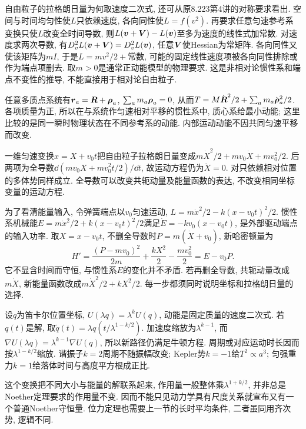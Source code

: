 自由粒子的拉格朗日量为何取速度二次式, 还可从原8.223第4讲的对称要求看出. 空间与时间均匀性使$L$只依赖速度, 各向同性使$L=f(v^2)$. 再要求任意匀速参考系变换只使$L$改变全时间导数, 则$L(\boldsymbol{v}+\boldsymbol{V})-L(\boldsymbol{v})$至多为速度的线性式加常数. 对速度求两次导数, 有$D_v^2L(\boldsymbol{v}+\boldsymbol{V})=D_v^2L(\boldsymbol{v})$, 任意$\boldsymbol{V}$使Hessian为常矩阵. 各向同性又使该矩阵为$mI$, 于是$L=m v^2/2+$常数, 可能的固定线性速度项被各向同性排除或作为端点项删去. 取$m>0$是通常正动能模型的物理要求. 这是非相对论惯性系和端点不变性的推导, 不能直接用于相对论自由粒子.

任意多质点系统有$\boldsymbol{r}_a=\boldsymbol{R}+\boldsymbol{\rho}_a$, $\sum_am_a\boldsymbol{\rho}_a=0$, 从而$T=M\dot{\boldsymbol{R}}^2/2+\sum_am_a\dot{\boldsymbol{\rho}}_a^2/2$. 各项质量为正, 所以在与系统作匀速相对平移的惯性系中, 质心系给最小动能; 这里比较的是同一瞬时物理状态在不同参考系的动能. 内部运动动能不因共同匀速平移而改变.

一维匀速变换$x=X+v_0t$把自由粒子拉格朗日量变成$m\dot X^2/2+mv_0\dot X+mv_0^2/2$. 后两项为全导数$\dd(mv_0X+mv_0^2t/2)/\dd t$, 故运动方程仍为$\ddot X=0$. 对只依赖相对位置的多体势同样成立. 全导数可以改变共轭动量及能量函数的表达, 不改变相同坐标变量的运动方程.

为了看清能量输入, 令弹簧端点以$v_0$匀速运动, $L=m\dot x^2/2-k(x-v_0t)^2/2$. 惯性系机械能$E=m\dot x^2/2+k(x-v_0t)^2/2$满足$\dot E=-kv_0(x-v_0t)$, 是外部驱动端点的输入功率. 取$X=x-v_0t$, 不删全导数时$P=m(\dot X+v_0)$, 新哈密顿量为
\[
H'=\frac{(P-mv_0)^2}{2m}+\frac{kX^2}2-\frac{mv_0^2}2
=E-v_0P.
\]
它不显含时间而守恒, 与惯性系$E$的变化并不矛盾. 若再删全导数, 共轭动量改成$m\dot X$, 新能量函数改成$m\dot X^2/2+kX^2/2$. 每一步都须同时说明坐标和拉格朗日量的选择.

设$q$为笛卡尔位置坐标, $U(\lambda q)=\lambda^kU(q)$, 动能是固定质量的速度二次式. 若$q(t)$是解, 取$\widetilde q(t)=\lambda q(t/\lambda^{1-k/2})$. 加速度缩放为$\lambda^{k-1}$, 而$\nabla U(\lambda q)=\lambda^{k-1}\nabla U(q)$, 所以新路径仍满足牛顿方程. 周期或对应运动时长因而按$\lambda^{1-k/2}$缩放. 谐振子$k=2$周期不随振幅改变; Kepler势$k=-1$给$T^2\propto a^3$; 匀强重力$k=1$给落体时间与高度平方根成正比.

这个变换把不同大小与能量的解联系起来, 作用量一般整体乘$\lambda^{1+k/2}$, 并非总是Noether定理要求的作用量不变. 因而不能只见动力学具有尺度关系就宣布又有一个普通Noether守恒量. 位力定理也需要上一节的长时平均条件, 二者虽同用齐次势, 逻辑不同.
